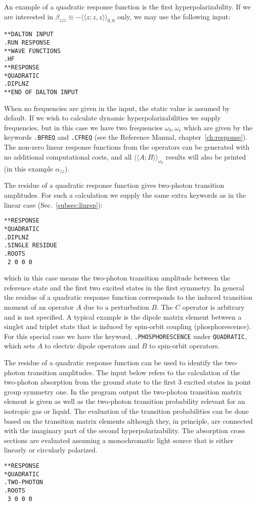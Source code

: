 An example of a quadratic response function
is the first
hyperpolarizability. If we are
interested in
$\beta_{zzz}\equiv-\langle\!\langle z;z,z\rangle\!\rangle_{0,0}$
only, we may use the following input:
\begin{verbatim}
**DALTON INPUT
.RUN RESPONSE
**WAVE FUNCTIONS
.HF
**RESPONSE
*QUADRATIC
.DIPLNZ
**END OF DALTON INPUT
\end{verbatim}
When no frequencies are given in the input, the static value is assumed by
default. If we wish to calculate dynamic hyperpolarizabilities we supply
frequencies, but in this case we have two frequencies
$\omega_b, \omega_c$ which are given by the keywords \texttt{.BFREQ} and
{\tt .CFREQ} (see the Reference Manual, chapter~\ref{ch:response}).
The non-zero linear response functions from the operators can be
generated with no additional computational costs, and all
$\langle\!\langle A;B\rangle\!\rangle_{\omega_b}$ results
will also be printed (in this example $\alpha_{zz}$).

The residue of a quadratic response function gives two-photon
transition amplitudes. For such a
calculation we supply the same extra
keywords as in the linear case (Sec.~\ref{subsec:linrsp}):
\begin{verbatim}
**RESPONSE
*QUADRATIC
.DIPLNZ
.SINGLE RESIDUE
.ROOTS
 2 0 0 0
\end{verbatim}
which in this case means the two-photon transition
amplitude between the
reference state and the first two excited states in the first symmetry.  In
general the residue of a quadratic response function corresponds to the
induced transition moment of an operator $A$ due to a perturbation $B$.
The $C$ operator is arbitrary and is not specified.  A typical example is
the dipole matrix element between a singlet and triplet state that is
induced by spin-orbit coupling
(phosphorescence). For this special case we
have the keyword, {\tt .PHOSPHORESCENCE} under {\tt *QUADRATIC}, which sets
$A$ to electric dipole operators and $B$ to spin-orbit operators.

The residue of a quadratic response function can be used to identify
the two-photon transition amplitudes. The input below refers to the
calculation of the two-photon absorption from the ground state to the
first 3 excited states in point group symmetry one. In the program
output the two-photon transition matrix element is given as well as
the two-photon transition probability relevant for an isotropic gas or
liquid. The evaluation of the transition probabilities can be done based
on the transition matrix elements although they, in principle, are
connected with the imaginary part of the second
hyperpolarizability. The absorption cross sections are evaluated
assuming a monochromatic light source that is either linearly or
circularly polarized.
\begin{verbatim}
**RESPONSE
*QUADRATIC
.TWO-PHOTON
.ROOTS
 3 0 0 0
\end{verbatim}

